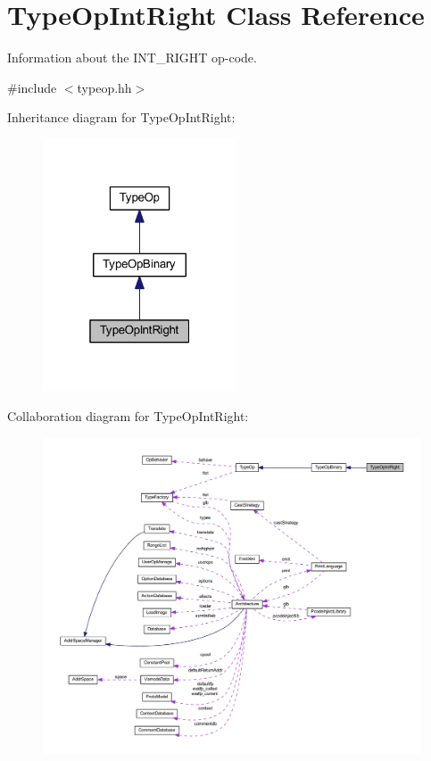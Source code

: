 \hypertarget{class_type_op_int_right}{}\section{Type\+Op\+Int\+Right Class Reference}
\label{class_type_op_int_right}


Information about the I\+N\+T\+\_\+\+R\+I\+G\+HT op-\/code.  




{\ttfamily \#include $<$typeop.\+hh$>$}



Inheritance diagram for Type\+Op\+Int\+Right\+:
\nopagebreak
\begin{figure}[H]
\begin{center}
\leavevmode
\includegraphics[width=163pt]{class_type_op_int_right__inherit__graph}
\end{center}
\end{figure}


Collaboration diagram for Type\+Op\+Int\+Right\+:
\nopagebreak
\begin{figure}[H]
\begin{center}
\leavevmode
\includegraphics[width=350pt]{class_type_op_int_right__coll__graph}
\end{center}
\end{figure}
